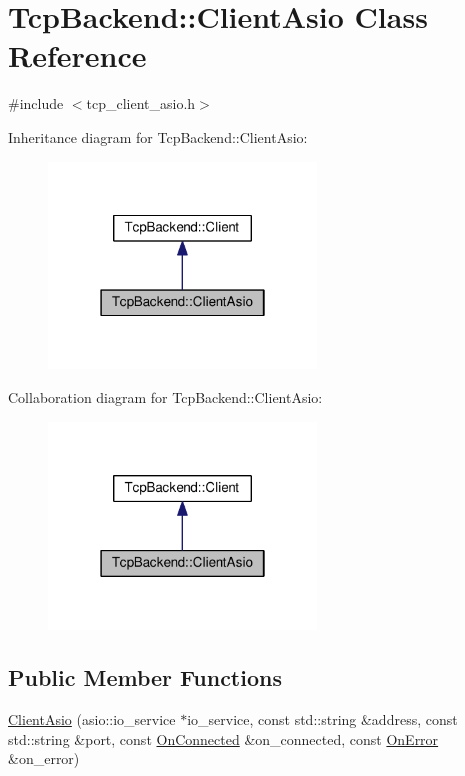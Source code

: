 \hypertarget{classTcpBackend_1_1ClientAsio}{}\section{Tcp\+Backend\+:\+:Client\+Asio Class Reference}
\label{classTcpBackend_1_1ClientAsio}


{\ttfamily \#include $<$tcp\+\_\+client\+\_\+asio.\+h$>$}



Inheritance diagram for Tcp\+Backend\+:\+:Client\+Asio\+:
\nopagebreak
\begin{figure}[H]
\begin{center}
\leavevmode
\includegraphics[width=202pt]{classTcpBackend_1_1ClientAsio__inherit__graph}
\end{center}
\end{figure}


Collaboration diagram for Tcp\+Backend\+:\+:Client\+Asio\+:
\nopagebreak
\begin{figure}[H]
\begin{center}
\leavevmode
\includegraphics[width=202pt]{classTcpBackend_1_1ClientAsio__coll__graph}
\end{center}
\end{figure}
\subsection*{Public Member Functions}
\begin{DoxyCompactItemize}
\item 
\hyperlink{classTcpBackend_1_1ClientAsio_ac745c20f4213037c842d2d7c89397e84}{Client\+Asio} (asio\+::io\+\_\+service $\ast$io\+\_\+service, const std\+::string \&address, const std\+::string \&port, const \hyperlink{namespaceTcpBackend_afa30fa9a706436148fb2857a2174e625}{On\+Connected} \&on\+\_\+connected, const \hyperlink{namespaceTcpBackend_a17e8f044749312a6692cd0135565cbc4}{On\+Error} \&on\+\_\+error)
\end{DoxyCompactItemize}


